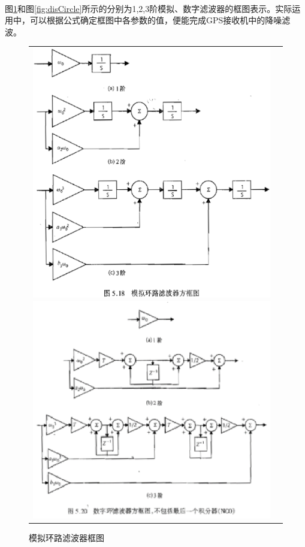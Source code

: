 \documentclass[UTF8,titlepage]{ctexart}
\begin{document}
\paragraph*{}图\ref{fig:conCircle}和图\ref{fig:disCircle}所示的分别为1,2,3阶模拟、数字滤波器的框图表示。实际运用中，可以根据公式确定框图中各参数的值，便能完成GPS接收机中的降噪滤波。
\begin{figure}[H]
  \begin{tabular}{cc}
    \begin{minipage}{.5\textwidth}
    \includegraphics[width = \textwidth]{conCircle.eps}
    \caption{模拟环路滤波器框图\cite{gpsPrin}}
    \label{fig:conCircle}
    \end{minipage}
    \begin{minipage}{.5\textwidth}
    \includegraphics[width = \textwidth]{disCircle.eps}

\end{minipage}
\end{tabular}
\end{figure}
\end{document}
